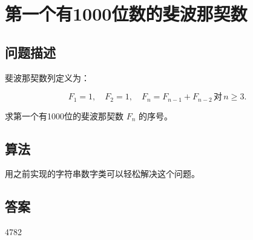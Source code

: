 \section{第一个有1000位数的斐波那契数}\label{sec:problem25}
\subsection{问题描述}
\begin{tcolorbox}

斐波那契数列定义为：

\[
F_1 = 1, \quad F_2 = 1, \quad F_n = F_{n-1} + F_{n-2} \, \text{对} \, n \geq 3.
\]

求第一个有1000位的斐波那契数 \( F_n \) 的序号。
\end{tcolorbox}

\subsection{算法}
用之前实现的字符串数字类可以轻松解决这个问题。

\subsection{答案}
4782
